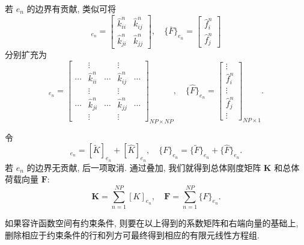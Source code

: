 若 $e_n$ 的边界有贡献, 类似可将
\begin{equation*}
[\overline{K}]_{e_n} = \begin{bmatrix} \hat{k}_{ii}^n & \hat{k}_{ij}^n \\ \hat{k}_{ji}^n &
\hat{k}_{jj}^n \end{bmatrix}, \quad \{\overline{F}\}_{e_n} = \begin{bmatrix} \hat{f}_i^n \\
\hat{f}_j^n \end{bmatrix}
\end{equation*}
分别扩充为
\begin{equation*}
[\widehat{K}]_{e_n} = \begin{bmatrix}
& \vdots & & \vdots & \\
\cdots & \hat{k}_{ii}^n & \cdots & \hat{k}_{ij}^n & \cdots \\
& \vdots & & \vdots & \\
\cdots & \hat{k}_{ji}^n & \cdots & \hat{k}_{jj}^n & \cdots \\
& \vdots & & \vdots &
\end{bmatrix}_{NP \times NP}, \quad
\{\widehat{F}\}_{e_n} = \begin{bmatrix}
\vdots \\
\hat{f}_i^n \\
\vdots \\
\hat{f}_j^n \\
\vdots
\end{bmatrix}_{NP \times 1}.
\end{equation*}

令
\begin{equation*}
[K]_{e_n} = [\widetilde{K}]_{e_n} + [\widehat{K}]_{e_n}, \quad \{F\}_{e_n} =
\{\widetilde{F}\}_{e_n} + \{\widehat{F}\}_{e_n}.
\end{equation*}
若 $e_n$ 的边界无贡献, 后一项取消. 通过叠加, 我们就得到总体刚度矩阵 $\boldsymbol{K}$
和总体荷载向量 $\boldsymbol{F}$:
\begin{equation*}
\boldsymbol{K} = \sum_{n=1}^{NP} [K]_{e_n}, \quad \boldsymbol{F} = \sum_{n=1}^{NP} \{F\}_{e_n}.
\end{equation*}

\begin{note}
如果容许函数空间有约束条件, 则要在以上得到的系数矩阵和右端向量的基础上,
删除相应于约束条件的行和列方可最终得到相应的有限元线性方程组.
\end{note}

